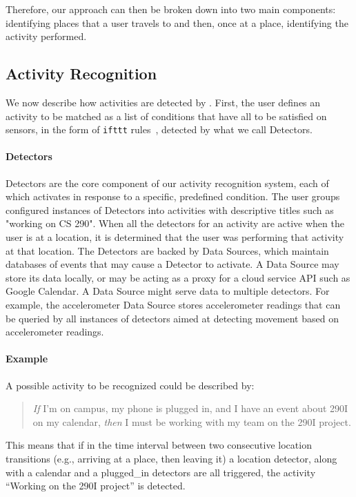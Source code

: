 \documentclass{acm_proc_article-sp}
\begin{document}
Therefore, our approach can then be broken down into two main components: identifying places that a user travels to and then, once at a place, identifying the activity performed.

\subsection {Activity Recognition}
We now describe how activities are detected by \LS. First, the user defines an activity to be matched as a list of conditions that have all to be satisfied on sensors, in the form of {\tt ifttt} rules~\cite{ifttt}, detected by what we call Detectors.

\paragraph{Detectors}  Detectors are the core component of our activity recognition system, each of which activates in response to a specific, predefined condition. 
The user groups configured instances of Detectors into activities with descriptive titles such as "working on CS 290". When all the detectors for an activity are active when the user is at a location, it is determined that the user was performing that activity at that location. The Detectors are backed by Data Sources, which maintain databases of events that may cause a Detector to activate. A Data Source may store its data locally, or may be acting as a proxy for a cloud service API such as Google Calendar. 
A Data Source might serve data to multiple detectors. For example, the accelerometer Data Source stores accelerometer readings that can be queried by all instances of detectors aimed at detecting movement based on accelerometer readings.

\paragraph{Example} A possible activity to be recognized could be described by:
\begin{quote}{\it If} I'm on campus, my phone is plugged in, and I have an event about 290I on my calendar, {\it then} I must be working with my team on the 290I project.\end{quote}
This means that if in the time interval between two consecutive location transitions (e.g., arriving at a place, then leaving it) a location detector, along with a calendar and a plugged\_in detectors are all triggered, the activity ``Working on the 290I project'' is detected.
\end{document}
